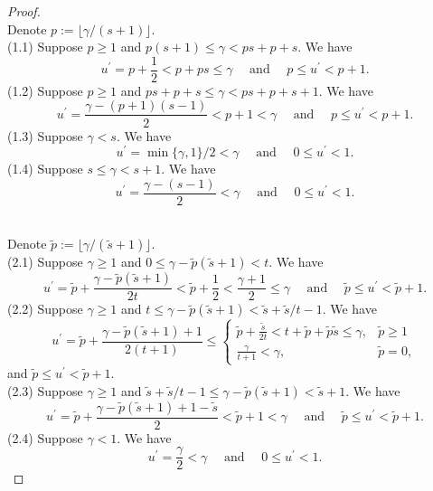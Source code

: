 \documentclass{article}
\theoremstyle{plain}
\theoremstyle{definition}
\theoremstyle{remark}
\begin{document}
\begin{appendix}
\begin{proof}
\\
\noindent Denote $p:=\lfloor \gamma/(s+1)\rfloor$.\\
   (1.1) Suppose $p \geq 1$ and $p(s+1) \leq \gamma < ps+p+s$. We have
   $$
   u^{\prime} = p+\frac{1}{2} < p+ps \leq \gamma \quad \text{ and } \quad p \leq u^{\prime} < p+1.
   $$
   (1.2) Suppose $p \geq 1$ and $ps+p+s \leq \gamma < ps+p+s+1$. We have
   $$
   u^{\prime} = \frac{\gamma - (p+1)(s-1)}{2} < p+1 < \gamma \quad \text{ and } \quad p \leq u^{\prime} < p+1.
   $$
   (1.3) Suppose $\gamma < s$. We have
   $$
   u^{\prime} = \min\{\gamma, 1\}/2 < \gamma \quad \text{ and } \quad 0 \leq u^{\prime} < 1.
   $$
   (1.4) Suppose $s \leq \gamma < s+1$. We have
   $$
   u^{\prime} = \frac{\gamma - (s-1)}{2} < \gamma \quad \text{ and } \quad 0 \leq u^{\prime} < 1.
   $$

   
\\
\noindent Denote $\tilde{p}:=\lfloor \gamma/(\tilde{s}+1)\rfloor$.\\
   (2.1) Suppose $\gamma \geq 1$ and $0 \leq \gamma - \tilde{p}(\tilde{s} +1) < t$. We have
   $$
   u^{\prime} = \tilde{p} + \frac{\gamma - \tilde{p}(\tilde{s} +1)}{2t} < \tilde{p}+\frac{1}{2} < \frac{\gamma + 1}{2} \leq \gamma \quad \text{ and } \quad \tilde{p} \leq u^{\prime} < \tilde{p}+1.
   $$  
   (2.2) Suppose $\gamma \geq 1$ and $t \leq \gamma - \tilde{p}(\tilde{s} +1) < \tilde{s} + \tilde{s} /t - 1$. We have
   $$
   u^{\prime} = \tilde{p} + \frac{\gamma - \tilde{p}(\tilde{s} +1)+1}{2(t+1)} \leq 
   \left\{\begin{matrix}
\tilde{p}+\frac{\tilde{s} }{2t} < t +\tilde{p} + \tilde{p}\tilde{s}  \leq \gamma, & \tilde{p} \geq 1  \\
\frac{\gamma}{t + 1} < \gamma, & \tilde{p}=0,
\end{matrix}\right.
   $$  
   and $\tilde{p} \leq u^{\prime} < \tilde{p}+1$.\\
   (2.3) Suppose $\gamma \geq 1$ and $\tilde{s} + \tilde{s} /t - 1 \leq \gamma - \tilde{p}(\tilde{s} +1) < \tilde{s} +1$. We have
   $$
   u^{\prime} = \tilde{p} + \frac{\gamma - \tilde{p}(\tilde{s} +1)+1-\tilde{s} }{2} < \tilde{p}+1<\gamma \quad \text{ and } \quad \tilde{p} \leq u^{\prime} < \tilde{p}+1.
   $$ 
   (2.4) Suppose $\gamma < 1$. We have
   $$
   u^{\prime} = \frac{\gamma}{2} < \gamma \quad \text{ and } \quad 0 \leq u^{\prime} < 1.
   $$ 



\end{proof}
\end{appendix}
\end{document}
